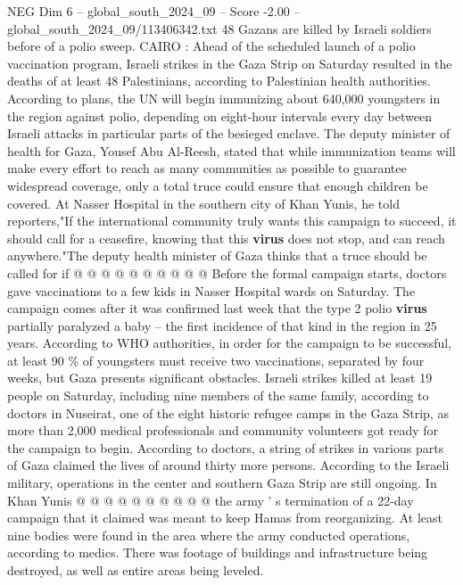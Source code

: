 \begin{textsample}{NEG Dim 6 – global\_south\_2024\_09 – Score -2.00 – global\_south\_2024\_09/113406342.txt}  \label{ex:f6_neg_031}
48 Gazans are killed by Israeli soldiers before of a polio sweep.
CAIRO : Ahead of the scheduled launch of a polio vaccination program, Israeli strikes in the Gaza Strip on Saturday resulted in the deaths of at least 48 Palestinians, according to Palestinian health authorities.
According to plans, the UN will begin immunizing about 640,000 youngsters in the region against polio, depending on eight-hour intervals every day between Israeli attacks in particular parts of the besieged enclave.
The deputy minister of health for Gaza, Yousef Abu Al-Reesh, stated that while immunization teams will make every effort to reach as many communities as possible to guarantee widespread coverage, only a total truce could ensure that enough children be covered.
At Nasser Hospital in the southern city of Khan Yunis, he told reporters,"If the international community truly wants this campaign to succeed, it should call for a ceasefire, knowing that this \textbf{virus} does not stop, and can reach anywhere."The deputy health minister of Gaza thinks that a truce should be called for if @ @ @ @ @ @ @ @ @ @ Before the formal campaign starts, doctors gave vaccinations to a few kids in Nasser Hospital wards on Saturday.
The campaign comes after it was confirmed last week that the type 2 polio \textbf{virus} partially paralyzed a baby -- the first incidence of that kind in the region in 25 years.
According to WHO authorities, in order for the campaign to be successful, at least 90 \% of youngsters must receive two vaccinations, separated by four weeks, but Gaza presents significant obstacles.
Israeli strikes killed at least 19 people on Saturday, including nine members of the same family, according to doctors in Nuseirat, one of the eight historic refugee camps in the Gaza Strip, as more than 2,000 medical professionals and community volunteers got ready for the campaign to begin.
According to doctors, a string of strikes in various parts of Gaza claimed the lives of around thirty more persons.
According to the Israeli military, operations in the center and southern Gaza Strip are still ongoing.
In Khan Yunis @ @ @ @ @ @ @ @ @ @ the army ' s termination of a 22-day campaign that it claimed was meant to keep Hamas from reorganizing.
At least nine bodies were found in the area where the army conducted operations, according to medics.
There was footage of buildings and infrastructure being destroyed, as well as entire areas being leveled.

\end{textsample}
